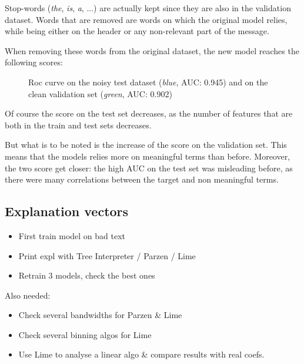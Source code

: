 \documentclass[a4paper,11pt]{kth-mag}
\begin{document}
Stop-words (\textit{the}, \textit{is}, \textit{a}, ...) are actually kept since they are also in the validation dataset. Words that are removed are words on which the original model relies, while being either on the header or any non-relevant part of the message.

When removing these words from the original dataset, the new model reaches the following scores:

\begin{figure}[h]
		\centering
    	\def\svgwidth{\columnwidth}
    	\resizebox{0.75\textwidth}{!}{}
    	\caption{Roc curve on the noisy test dataset (\textit{blue}, AUC: 0.945) and on the clean validation set (\textit{green}, AUC: 0.902)}
\end{figure}

Of course the score on the test set decreases, as the number of features that are both in the train and test sets decreases.

But what is to be noted is the increase of the score on the validation set. This means that the models relies more on meaningful terms than before. Moreover, the two score get closer: the high AUC on the test set was misleading before, as there were many correlations between the target and non meaningful terms.


\subsection{Explanation vectors}

\vspace{5.0\baselineskip}

\begin{itemize}
	\item First train model on bad text
	\item Print expl with Tree Interpreter / Parzen / Lime
	\item Retrain 3 models, check the best ones
\end{itemize}


Also needed:

\begin{itemize}
	\item Check several bandwidths for Parzen \& Lime
	\item Check several binning algos for Lime
	\item Use Lime to analyse a linear algo \& compare results with real coefs.
\end{itemize}
\end{document}
